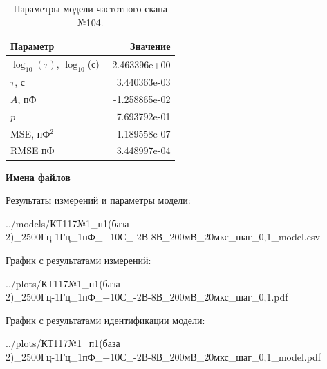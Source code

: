 \begin{table}[!ht]
    \centering
    \caption{Параметры модели частотного скана №104.}
    \begin{tabular}{|l|r|}
        \hline
        Параметр                                       & Значение                  \\ \hline
        $\log_{10}(\tau)$, $\log_{10}$(с)              & -2.463396e+00             \\ \hline
        $\tau$, с                                      & 3.440363e-03              \\ \hline
        $A$, пФ                                        & -1.258865e-02             \\ \hline
        $p$                                            & 7.693792e-01              \\ \hline
        MSE, пФ$^2$                                    & 1.189558e-07              \\ \hline
        RMSE пФ                                        & 3.448997e-04              \\ \hline
    \end{tabular}
    \label{table:frequency_scan_model_104}
\end{table}

\textbf{Имена файлов}

Результаты измерений и параметры модели:

\scriptsize../models/КТ117№1\_п1(база 2)\_2500Гц-1Гц\_1пФ\_+10С\_-2В-8В\_200мВ\_20мкс\_шаг\_0,1\_model.csv
\normalsize

График с результатами измерений:

\scriptsize../plots/КТ117№1\_п1(база 2)\_2500Гц-1Гц\_1пФ\_+10С\_-2В-8В\_200мВ\_20мкс\_шаг\_0,1.pdf
\normalsize

График с результатами идентификации модели:

\scriptsize../plots/КТ117№1\_п1(база 2)\_2500Гц-1Гц\_1пФ\_+10С\_-2В-8В\_200мВ\_20мкс\_шаг\_0,1\_model.pdf
\normalsize

